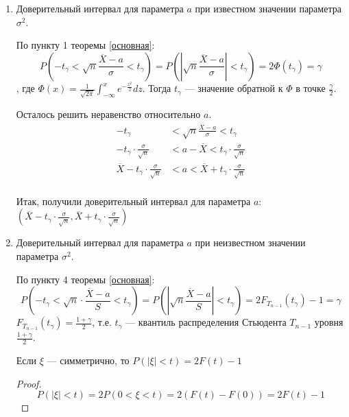 \begin{enumerate}
    \item Доверительный интервал для параметра \(a\) при известном значении параметра \(\sigma^2\).

          По пункту 1 теоремы \ref{основная}:
          \[
              P\left( - t_\gamma < \sqrt{n} \frac{ \overline{X} - a}{\sigma} < t_\gamma\right) = P\left(\left|\sqrt{n} \frac{ \overline{X} - a}{\sigma}\right| < t_\gamma\right) = 2 \Phi(t_\gamma) = \gamma
          \]
          , где \(\Phi(x) = \frac{1}{\sqrt{2 \pi}} \int_{ - \infty }^x e^{ - \frac{z^2}{2}} dz\). Тогда \(t_\gamma\) --- значение обратной к \(\Phi\) в точке \(\frac{\gamma}{2}\). \?

          Осталось решить неравенство относительно \(a\).
          \begin{align*}
              - t_\gamma                                           & < \sqrt{n} \frac{ \overline{X} - a}{\sigma} < t_\gamma      \\
              - t_\gamma \cdot \frac{\sigma}{\sqrt{n}}             & < a - \overline{X} < t_\gamma \cdot \frac{\sigma}{\sqrt{n}} \\
              \overline{X}- t_\gamma \cdot \frac{\sigma}{\sqrt{n}} & < a < \overline{X} + t_\gamma \cdot \frac{\sigma}{\sqrt{n}} \\
          \end{align*}

          Итак, получили доверительный интервал для параметра \(a\): \(\left(\overline{X} - t_\gamma \cdot \frac{\sigma}{\sqrt{n}}, \overline{X} + t_\gamma \cdot \frac{\sigma}{\sqrt{n}}\right)\)

    \item Доверительный интервал для параметра \(a\) при неизвестном значении параметра \(\sigma^2\).

          По пункту 4 теоремы \ref{основная}:
          \[
              P\left( -t_\gamma < \sqrt{n} \cdot \frac{ \overline{X} - a}{S} < t_\gamma\right) = P\left(\left|\sqrt{n} \frac{ \overline{X} - a}{S}\right| < t_\gamma\right) = 2 F_{T_{n-1}}(t_\gamma) - 1 = \gamma
          \]
          \(F_{T_{n-1}}(t_\gamma) = \frac{1 + \gamma}{2}\), т.е. \(t_\gamma\) --- квантиль распределения Стьюдента \(T_{n-1}\) уровня \(\frac{1 + \gamma}{2}\).

          \begin{remark}
              Если \(\xi\) --- симметрично, то \(P(|\xi| < t) = 2 F(t) - 1\)
          \end{remark}
          \begin{proof}
              \[P(|\xi| < t) = 2 P(0 < \xi < t) = 2(F(t) - F(0)) = 2F(t) - 1\]
          \end{proof}


\end{enumerate}
